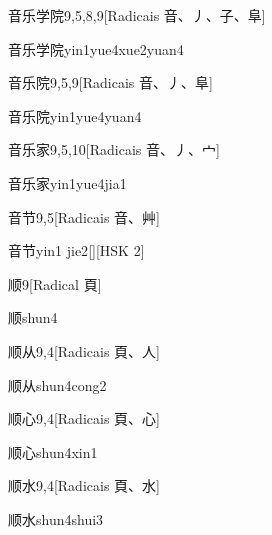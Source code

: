 \begin{entry}{音乐学院}{9,5,8,9}[Radicais ⾳、⼃、⼦、⾩]
  \begin{phonetics}{音乐学院}{yin1yue4xue2yuan4}
  \end{phonetics}
\end{entry}

\begin{entry}{音乐院}{9,5,9}[Radicais ⾳、⼃、⾩]
  \begin{phonetics}{音乐院}{yin1yue4yuan4}
  \end{phonetics}
\end{entry}

\begin{entry}{音乐家}{9,5,10}[Radicais ⾳、⼃、⼧]
  \begin{phonetics}{音乐家}{yin1yue4jia1}
  \end{phonetics}
\end{entry}

\begin{entry}{音节}{9,5}[Radicais ⾳、⾋]
  \begin{phonetics}{音节}{yin1 jie2}[][HSK 2]
  \end{phonetics}
\end{entry}

\begin{entry}{顺}{9}[Radical ⾴]
  \begin{phonetics}{顺}{shun4}
  \end{phonetics}
\end{entry}

\begin{entry}{顺从}{9,4}[Radicais ⾴、⼈]
  \begin{phonetics}{顺从}{shun4cong2}
  \end{phonetics}
\end{entry}

\begin{entry}{顺心}{9,4}[Radicais ⾴、⼼]
  \begin{phonetics}{顺心}{shun4xin1}
  \end{phonetics}
\end{entry}

\begin{entry}{顺水}{9,4}[Radicais ⾴、⽔]
  \begin{phonetics}{顺水}{shun4shui3}
  \end{phonetics}
\end{entry}

